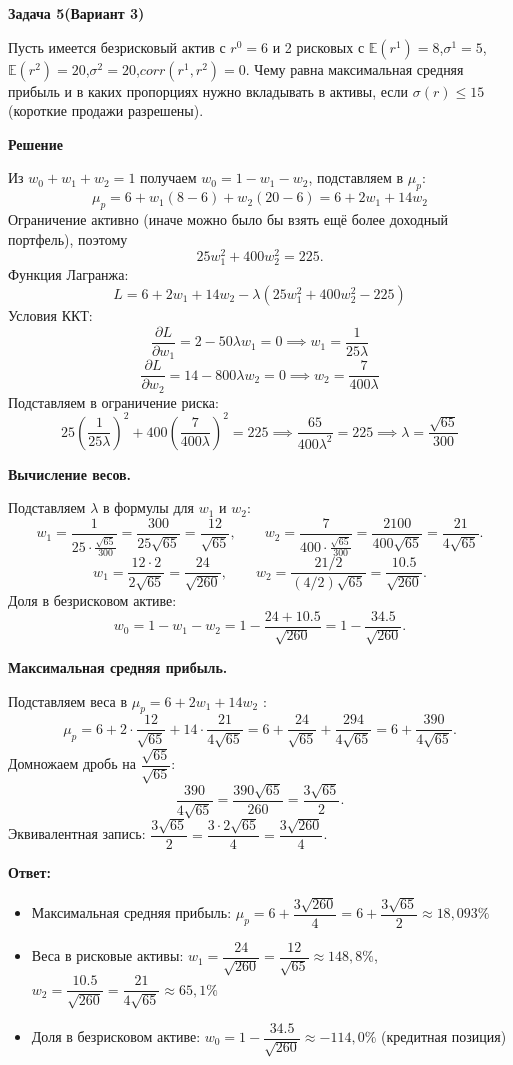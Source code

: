 \documentclass[a4paper,12pt]{extarticle}
\begin{document}
\begin{center}
    \textbf{Задача 5(Вариант 3)}
\end{center}
Пусть имеется безрисковый актив с $r^0 = 6$ и 2 рисковых с $\mathbb{E}(r^1) = 8$,$\sigma^1 = 5$,$\mathbb{E}(r^2) = 20$,$\sigma^2 = 20$,$corr(r^1,r^2) = 0$. Чему равна максимальная средняя прибыль и в каких пропорциях нужно вкладывать в активы, если $\sigma(r) \leq 15$ (короткие продажи разрешены).
\begin{center}
    \textbf{Решение}
\end{center}

Из $w_0 + w_1 + w_2 = 1$ получаем $w_0 = 1 - w_1 - w_2$, подставляем в $\mu_p$:
$$\mu_p = 6 + w_1(8-6) + w_2(20-6) = 6 + 2w_1 + 14w_2$$
Ограничение активно (иначе можно было бы взять ещё более доходный портфель), поэтому
$$25w_1^2 + 400w_2^2 = 225.$$
Функция Лагранжа:
$$L = 6 + 2w_1 + 14w_2 - \lambda(25w_1^2 + 400w_2^2 - 225)$$
Условия ККТ:
$$\frac{\partial L}{\partial w_1} = 2 - 50\lambda w_1 = 0 \implies w_1 = \frac{1}{25\lambda}$$
$$\frac{\partial L}{\partial w_2} = 14 - 800\lambda w_2 = 0 \implies w_2 = \frac{7}{400\lambda}$$
Подставляем в ограничение риска:
$$25\left(\frac{1}{25\lambda}\right)^2 + 400\left(\frac{7}{400\lambda}\right)^2 = 225
\implies \frac{65}{400\lambda^2} = 225
\implies \lambda = \frac{\sqrt{65}}{300}$$

\begin{center}\textbf{Вычисление весов.}\end{center}    
Подставляем $\lambda$ в формулы для $w_1$ и $w_2$:
$$w_1 = \frac{1}{25 \cdot \frac{\sqrt{65}}{300}} = \frac{300}{25\sqrt{65}} = \frac{12}{\sqrt{65}}, \qquad
w_2 = \frac{7}{400 \cdot \frac{\sqrt{65}}{300}} = \frac{2100}{400\sqrt{65}} = \frac{21}{4\sqrt{65}}.$$
$$w_1 = \frac{12 \cdot 2}{2\sqrt{65}} = \frac{24}{\sqrt{260}}, \qquad
w_2 = \frac{21/2}{(4/2)\sqrt{65}} = \frac{10.5}{\sqrt{260}}.$$
Доля в безрисковом активе:
$$w_0 = 1 - w_1 - w_2 = 1 - \frac{24 + 10.5}{\sqrt{260}} = 1 - \frac{34.5}{\sqrt{260}}.$$

\begin{center}\textbf{Максимальная средняя прибыль.}\end{center}
Подставляем веса в $\mu_p = 6 + 2w_1 + 14w_2$ :
$$\mu_p = 6 + 2 \cdot \frac{12}{\sqrt{65}} + 14 \cdot \frac{21}{4\sqrt{65}}
= 6 + \frac{24}{\sqrt{65}} + \frac{294}{4\sqrt{65}}
= 6 + \frac{390}{4\sqrt{65}}.$$
Домножаем дробь на $\dfrac{\sqrt{65}}{\sqrt{65}}$:
$$\frac{390}{4\sqrt{65}} = \frac{390\sqrt{65}}{260} = \frac{3\sqrt{65}}{2}.$$
Эквивалентная запись: $\dfrac{3\sqrt{65}}{2} = \dfrac{3 \cdot 2\sqrt{65}}{4} = \dfrac{3\sqrt{260}}{4}$.

\textbf{Ответ:}
\begin{itemize}
    \item Максимальная средняя прибыль: $\mu_p = 6 + \dfrac{3\sqrt{260}}{4} = 6 + \dfrac{3\sqrt{65}}{2} \approx 18{,}093\%$
    \item Веса в рисковые активы: $w_1 = \dfrac{24}{\sqrt{260}} = \dfrac{12}{\sqrt{65}} \approx 148{,}8\%$, $w_2 = \dfrac{10.5}{\sqrt{260}} = \dfrac{21}{4\sqrt{65}} \approx 65{,}1\%$
    \item Доля в безрисковом активе: $w_0 = 1 - \dfrac{34.5}{\sqrt{260}} \approx -114{,}0\%$ (кредитная позиция)
\end{itemize}
\end{document}
